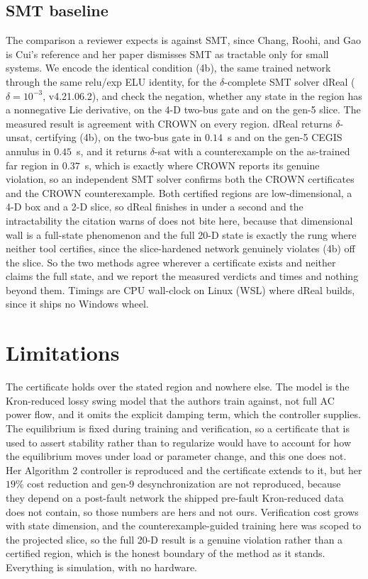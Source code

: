 \documentclass[letterpaper,journal]{IEEEtran}
\begin{document}
\subsection{SMT baseline}
The comparison a reviewer expects is against SMT, since Chang, Roohi, and Gao is
Cui's reference and her paper dismisses SMT as tractable only for small systems. We
encode the identical condition (4b), the same trained network through the same
relu/exp ELU identity, for the $\delta$-complete SMT solver dReal
($\delta=10^{-3}$, v4.21.06.2), and check the negation, whether any state in the
region has a nonnegative Lie derivative, on the 4-D two-bus gate and on the gen-5
slice. The measured result is agreement with CROWN on every region. dReal returns
$\delta$-unsat, certifying (4b), on the two-bus gate in $0.14$~s and on the gen-5
CEGIS annulus in $0.45$~s, and it returns $\delta$-sat with a counterexample on the
as-trained far region in $0.37$~s, which is exactly where CROWN reports its genuine
violation, so an independent SMT solver confirms both the CROWN certificates and
the CROWN counterexample. Both certified regions are low-dimensional, a 4-D box and
a 2-D slice, so dReal finishes in under a second and the intractability the citation
warns of does not bite here, because that dimensional wall is a full-state
phenomenon and the full 20-D state is exactly the rung where neither tool certifies,
since the slice-hardened network genuinely violates (4b) off the slice. So the two
methods agree wherever a certificate exists and neither claims the full state, and
we report the measured verdicts and times and nothing beyond them. Timings are
CPU wall-clock on Linux (WSL) where dReal builds, since it ships no Windows wheel.

\section{Limitations}
The certificate holds over the stated region and nowhere else. The model is the
Kron-reduced lossy swing model that the authors train against, not full AC power
flow, and it omits the explicit damping term, which the controller supplies. The
equilibrium is fixed during training and verification, so a certificate that is
used to assert stability rather than to regularize would have to account for how
the equilibrium moves under load or parameter change, and this one does not.
Her Algorithm 2 controller is reproduced and the certificate extends to it, but her
$19\%$ cost reduction and gen-9 desynchronization are not reproduced, because they
depend on a post-fault network the shipped pre-fault Kron-reduced data does not
contain, so those numbers are hers and not ours. Verification cost grows with state
dimension, and the counterexample-guided
training here was scoped to the projected slice, so the full 20-D result is a
genuine violation rather than a certified region, which is the honest boundary of
the method as it stands. Everything is simulation, with no hardware.
\end{document}
